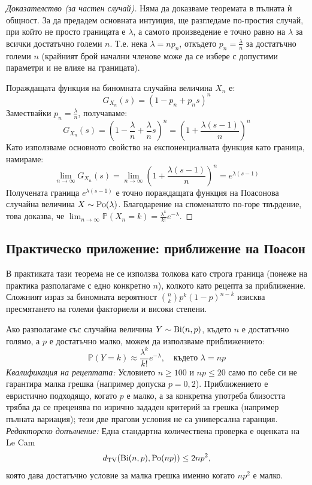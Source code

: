 \begin{proof}[Доказателство (за частен случай)]
Няма да доказваме теоремата в пълната ѝ общност. За да предадем основната интуиция, ще разгледаме по-простия случай, при който не просто границата е $\lambda$, а самото произведение е точно равно на $\lambda$ за всички достатъчно големи $n$. Т.е. нека $\lambda = n p_n$, откъдето $p_n = \frac{\lambda}{n}$ за достатъчно големи $n$ (крайният брой начални членове може да се избере с допустими параметри и не влияе на границата).

Пораждащата функция на биномната случайна величина $X_n$ е:
\[
G_{X_n}(s) = \left(1 - p_n + p_n s\right)^n
\]
Замествайки $p_n = \frac{\lambda}{n}$, получаваме:
\[
G_{X_n}(s) = \left(1 - \frac{\lambda}{n} + \frac{\lambda}{n} s\right)^n = \left(1 + \frac{\lambda (s-1)}{n}\right)^n
\]
Като използваме основното свойство на експоненциалната функция като граница, намираме:
\[
\lim_{n \to \infty} G_{X_n}(s) = \lim_{n \to \infty} \left(1 + \frac{\lambda (s-1)}{n}\right)^n = e^{\lambda (s-1)}
\]
Получената граница $e^{\lambda (s-1)}$ е точно пораждащата функция на Поасонова случайна величина $X \sim \operatorname{Po}(\lambda)$. Благодарение на споменатото по-горе твърдение, това доказва, че $\lim_{n \to \infty} \mathbb{P}(X_n = k) = \frac{\lambda^k}{k!} e^{-\lambda}$.

\end{proof}

\subsection{Практическо приложение: приближение на Поасон}

В практиката тази теорема не се използва толкова като строга граница (понеже на практика разполагаме с едно конкретно $n$), колкото като рецепта за приближение. Сложният израз за биномната вероятност $\binom{n}{k} p^k (1-p)^{n-k}$ изисква пресмятането на големи факториели и високи степени.

Ако разполагаме със случайна величина $Y \sim \operatorname{Bi}(n, p)$, където $n$ е достатъчно голямо, а $p$ е достатъчно малко, можем да използваме приближението:
\[
\mathbb{P}(Y = k) \approx \frac{\lambda^k}{k!} e^{-\lambda}, \quad \text{където } \lambda = n p
\]
\emph{Квалификация на рецептата:} Условието $n \ge 100$ и $np \le 20$ само по себе си не гарантира малка грешка (например допуска $p=0{,}2$). Приближението е евристично подходящо, когато $p$ е малко, а за конкретна употреба близостта трябва да се преценява по изрично зададен критерий за грешка (например пълната вариация); тези две прагови условия не са универсална гаранция.
\emph{Редакторско допълнение:} Една стандартна количествена проверка е оценката на
Le Cam
\[
d_{\mathrm{TV}}\!\left(\operatorname{Bi}(n,p),\operatorname{Po}(np)\right)\le 2np^2,
\]
която дава достатъчно условие за малка грешка именно когато $np^2$ е малко.


